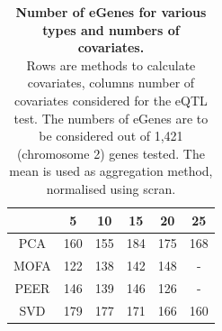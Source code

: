 \begin{table}[h]
    \centering
    \begin{tabular}{c|c c c c c}
    &       5 & 10 & 15 & 20 & 25  \\
    \hline
    PCA   & 160 & 155 &  184 & 175 & 168 \\
    MOFA  & 122 & 138 &  142 & 148 & -   \\
    PEER  & 146 & 139 &  146 & 126 & -   \\
    SVD   & 179 & 177 &  171 & 166 & 160 \\
    \end{tabular}
    \caption[Number and type of covariate comparison]{\textbf{Number of eGenes for various types and numbers of covariates.}\\
    Rows are methods to calculate covariates, columns number of covariates considered for the eQTL test.
    The numbers of eGenes are to be considered out of 1,421 (chromosome 2) genes tested.
    The mean is used as aggregation method, normalised using scran.}
    \label{tab:covariates}
\end{table}





